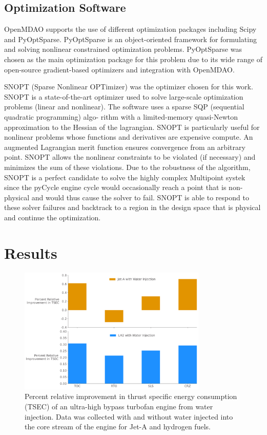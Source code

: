 \documentclass[conf]{new-aiaa}
\begin{document}
\subsection{Optimization Software}
OpenMDAO supports the use of different optimization packages including Scipy and PyOptSparse.
PyOptSparse is an object-oriented framework for formulating and solving nonlinear constrained optimization problems.
PyOptSparse was chosen as the main optimization package for this problem due to its wide range of open-source gradient-based optimizers and integration with OpenMDAO.

SNOPT (Sparse Nonlinear OPTimizer) was the optimizer chosen for this work.
SNOPT is a state-of-the-art optimizer used to solve large-scale optimization problems (linear and nonlinear).
The software uses a sparse SQP (sequential quadratic programming) algo- rithm with a limited-memory quasi-Newton approximation to the Hessian of the lagrangian.
SNOPT is particularly useful for nonlinear problems whose functions and derivatives are expensive compute.
An augmented Lagrangian merit function ensures convergence from an arbitrary point.
SNOPT allows the nonlinear constraints to be violated (if necessary) and minimizes the sum of these violations.
Due to the robustness of the algorithm, SNOPT is a perfect candidate to solve the highly complex Multipoint systek since the pyCycle engine cycle would occasionally reach a point that is non-physical and would thus cause the solver to fail.
SNOPT is able to respond to these solver failures and backtrack to a region in the design space that is physical and continue the optimization.


\section{Results}
\label{sec:results}

\begin{figure}[hbt!]
    \centering
    \includegraphics[width=0.8\textwidth]{JetA-H2_bar_chart_diff.pdf}
    \caption{Percent relative improvement in thrust specific energy consumption (TSEC) of an ultra-high bypass turbofan engine from water injection.
        Data was collected with and without water injected into the core stream of the engine for Jet-A and hydrogen fuels.}
    \label{fig:results}
\end{figure}
\end{document}
